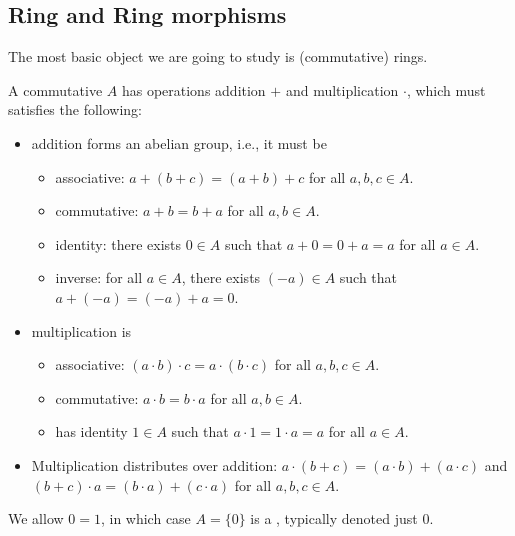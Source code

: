 \subsection{Ring and Ring morphisms}
The most basic object we are going to study
is (commutative) rings. 
\begin{definition}[Rings]
A commutative  $A$ has operations addition $+$ and multiplication $\cdot$, which 
must satisfies the following:
\begin{itemize}
    \item addition forms an abelian group,
    i.e., it must be 
    \begin{itemize}
    \item associative: $a+(b+c)=(a+b)+c$ for all $a,b,c\in A$.
    \item commutative: $a+b=b+a$ for all $a,b\in A$.
    \item identity: there exists $0\in A$ such that $a+0=0+a=a$
    for all $a\in A$.
    \item inverse: for all $a\in A$, there exists $(-a)\in A$ 
    such that $a+(-a)=(-a)+a=0$.
    \end{itemize}
    \item multiplication is 
    \begin{itemize}
    \item associative: $(a\cdot b)\cdot c = a\cdot (b\cdot c)$
    for all $a,b,c\in A$.
    \item commutative: $a\cdot b = b\cdot a$ for all $a,b\in A$.
    \item has identity $1\in A$ such that $a\cdot 1 = 1\cdot a
    = a$ for all $a\in A$.
    \end{itemize}
    \item Multiplication distributes over addition:
    $a\cdot (b+c)= (a\cdot b) + (a\cdot c)$
    and $(b+c)\cdot a = (b\cdot a) + (c\cdot a)$
    for all $a,b,c\in A$.
\end{itemize}
\end{definition}
We allow $0=1$, in which case $A=\{0\}$ is a ,
typically denoted just $0$.

